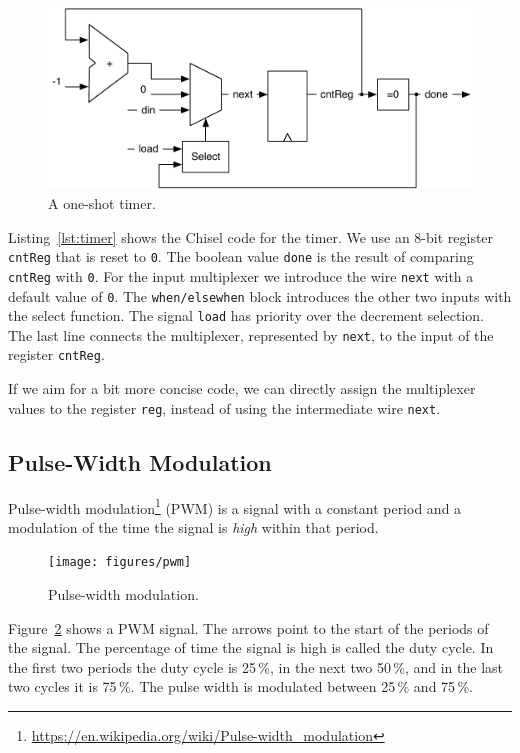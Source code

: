 \documentclass[%
    10pt,
    headinclude, footexclude,
    openright, %
    notitlepage,
    cleardoubleempty,
    headsepline,
    pointlessnumbers,
    bibtotoc, idxtotoc,
    ]{scrbook}
\newcommand{\code}[1]{{\small{\texttt{#1}}}}
\newcommand{\scale}{0.7}
\newcommand{\myref}[2]{\href{#1}{#2}}
\renewcommand{\myref}[2]{{#2}{\footnote{\url{#1}}}}
\begin{document}
\begin{figure}
  \centering
  \includegraphics[scale=\scale]{figures/timer}
  \caption{A one-shot timer.}
  \label{fig:timer}
\end{figure}

Listing~\ref{lst:timer} shows the Chisel code for the timer. We use an 8-bit register \code{cntReg}
that is reset to \code{0}. The boolean value \code{done} is the result of comparing \code{cntReg}
with \code{0}. For the input multiplexer we introduce the wire \code{next} with a default
value of \code{0}. The \code{when/elsewhen} block introduces the other two inputs with
the select function. The signal \code{load} has priority over the decrement selection.
The last line connects the multiplexer, represented by \code{next}, to the input of the
register \code{cntReg}.


If we aim for a bit more concise code, we can directly assign the multiplexer values to
the register \code{reg}, instead of using the intermediate wire \code{next}.

\subsection{Pulse-Width Modulation}

\myref{https://en.wikipedia.org/wiki/Pulse-width_modulation}{Pulse-width modulation} (PWM)
is a signal with a constant period and a modulation of the time the signal is \emph{high}
within that period.

\begin{figure}
  \centering
  \texttt{[image: figures/pwm]}
  \caption{Pulse-width modulation.}
  \label{fig:pwm}
\end{figure}

Figure~\ref{fig:pwm} shows a PWM signal. The arrows point to the start of the periods
of the signal. The percentage of time the signal is high is called the duty cycle.
In the first two periods the duty cycle is 25\,\%, in the next two 50\,\%, and in the last
two cycles it is 75\,\%. The pulse width is modulated between 25\,\% and 75\,\%.
\end{document}
